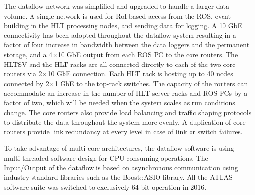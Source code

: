 The dataflow network was simplified and upgraded to handle a larger data volume.
A single network is used for 
RoI based access from the ROS, event 
building in the HLT processing nodes, and sending data for logging. 
A 10 GbE connectivity has been adopted throughout  the dataflow system
resulting in a factor of four increase in bandwidth between the data loggers and
the permanent storage, and a 4$\times$10 GbE output from each ROS PC to the core routers. 
The HLTSV and the HLT racks are all connected directly to each of the two core routers via 
 2$\times$10 GbE connection. Each HLT rack is hosting up to 40 nodes connected by 2$\times$1 GbE to the top-rack switches. 
The capacity of the routers can accommodate
an increase in the number of HLT server racks and ROS PCs by a factor of two, 
which will be needed when the system scales as run conditions 
change. The core routers also provide load balancing and traffic shaping protocols \cite{1742-6596-396-1-012033}
to distribute the data throughout the system more evenly. A duplication of core routers provide link redundancy at every level in 
case of link or switch failures.



To take advantage of multi-core architectures, the dataflow
 software is using multi-threaded software design for CPU consuming operations.
The Input/Output of the dataflow is based on asynchronous communication using industry standard libraries
such as the Boost::ASIO library. All the ATLAS software suite was switched to exclusively 64 bit operation in 2016.






